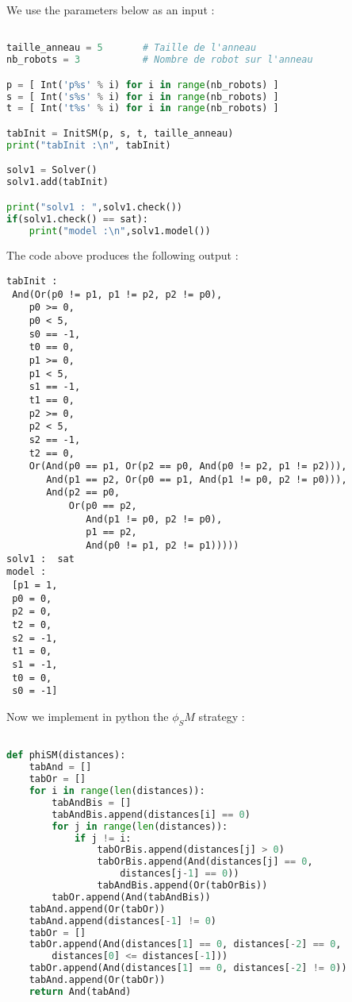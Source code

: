 \documentclass{article}
\begin{document}
We use the parameters below as an input :
\begin{lstlisting}[language=Python]

taille_anneau = 5       # Taille de l'anneau 
nb_robots = 3           # Nombre de robot sur l'anneau

p = [ Int('p%s' % i) for i in range(nb_robots) ]
s = [ Int('s%s' % i) for i in range(nb_robots) ]
t = [ Int('t%s' % i) for i in range(nb_robots) ]

tabInit = InitSM(p, s, t, taille_anneau)
print("tabInit :\n", tabInit)

solv1 = Solver()
solv1.add(tabInit)

print("solv1 : ",solv1.check())
if(solv1.check() == sat):
    print("model :\n",solv1.model())
\end{lstlisting}
The code above produces the following output : 
\begin{lstlisting}
tabInit :
 And(Or(p0 != p1, p1 != p2, p2 != p0),
    p0 >= 0,
    p0 < 5,
    s0 == -1,
    t0 == 0,
    p1 >= 0,
    p1 < 5,
    s1 == -1,
    t1 == 0,
    p2 >= 0,
    p2 < 5,
    s2 == -1,
    t2 == 0,
    Or(And(p0 == p1, Or(p2 == p0, And(p0 != p2, p1 != p2))),
       And(p1 == p2, Or(p0 == p1, And(p1 != p0, p2 != p0))),
       And(p2 == p0,
           Or(p0 == p2,
              And(p1 != p0, p2 != p0),
              p1 == p2,
              And(p0 != p1, p2 != p1)))))
solv1 :  sat
model :
 [p1 = 1,
 p0 = 0,
 p2 = 0,
 t2 = 0,
 s2 = -1,
 t1 = 0,
 s1 = -1,
 t0 = 0,
 s0 = -1]
\end{lstlisting}

Now we implement in python the $\phi_SM$ strategy :

\begin{lstlisting}[language=Python]

def phiSM(distances):
    tabAnd = []
    tabOr = []
    for i in range(len(distances)):
        tabAndBis = []
        tabAndBis.append(distances[i] == 0)
        for j in range(len(distances)):
            if j != i:
                tabOrBis.append(distances[j] > 0)
                tabOrBis.append(And(distances[j] == 0,
                    distances[j-1] == 0))
                tabAndBis.append(Or(tabOrBis))
        tabOr.append(And(tabAndBis))
    tabAnd.append(Or(tabOr))
    tabAnd.append(distances[-1] != 0)
    tabOr = []
    tabOr.append(And(distances[1] == 0, distances[-2] == 0,
        distances[0] <= distances[-1]))
    tabOr.append(And(distances[1] == 0, distances[-2] != 0))
    tabAnd.append(Or(tabOr))
    return And(tabAnd)
\end{lstlisting}
\end{document}
